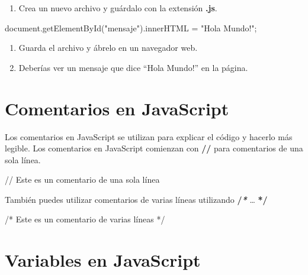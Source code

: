 \documentclass[
  a4paper,
  DIV=11,
  numbers=noendperiod,
  onepage,
  openany]{scrreprt}
\newenvironment{Shaded}{\begin{snugshade}}{\end{snugshade}}
\newcommand{\AttributeTok}[1]{\textcolor[rgb]{0.40,0.45,0.13}{#1}}
\newcommand{\BuiltInTok}[1]{\textcolor[rgb]{0.00,0.23,0.31}{#1}}
\newcommand{\CommentTok}[1]{\textcolor[rgb]{0.37,0.37,0.37}{#1}}
\newcommand{\FunctionTok}[1]{\textcolor[rgb]{0.28,0.35,0.67}{#1}}
\newcommand{\NormalTok}[1]{\textcolor[rgb]{0.00,0.23,0.31}{#1}}
\newcommand{\OperatorTok}[1]{\textcolor[rgb]{0.37,0.37,0.37}{#1}}
\newcommand{\StringTok}[1]{\textcolor[rgb]{0.13,0.47,0.30}{#1}}
\providecommand{\tightlist}{%
  \setlength{\itemsep}{0pt}\setlength{\parskip}{0pt}}\usepackage{longtable,booktabs,array}
\begin{document}
\begin{enumerate}
\def\labelenumi{\arabic{enumi}.}
\setcounter{enumi}{3}
\tightlist
\item
  Crea un nuevo archivo y guárdalo con la extensión \textbf{.js}.
\end{enumerate}

\begin{Shaded}
\begin{Highlighting}[]
\BuiltInTok{document}\OperatorTok{.}\FunctionTok{getElementById}\NormalTok{(}\StringTok{"mensaje"}\NormalTok{)}\OperatorTok{.}\AttributeTok{innerHTML} \OperatorTok{=} \StringTok{"Hola Mundo!"}\OperatorTok{;}
\end{Highlighting}
\end{Shaded}

\begin{enumerate}
\def\labelenumi{\arabic{enumi}.}
\setcounter{enumi}{4}
\item
  Guarda el archivo y ábrelo en un navegador web.
\item
  Deberías ver un mensaje que dice ``Hola Mundo!'' en la página.
\end{enumerate}

\section{Comentarios en JavaScript}\label{comentarios-en-javascript}

Los comentarios en JavaScript se utilizan para explicar el código y
hacerlo más legible. Los comentarios en JavaScript comienzan con
\textbf{//} para comentarios de una sola línea.

\begin{Shaded}
\begin{Highlighting}[]
\CommentTok{// Este es un comentario de una sola línea}
\end{Highlighting}
\end{Shaded}

También puedes utilizar comentarios de varias líneas utilizando
\textbf{/\emph{*}} \ldots{} \textbf{*/}

\begin{Shaded}
\begin{Highlighting}[]
\CommentTok{/*}
\CommentTok{Este es un comentario de varias líneas}
\CommentTok{*/}
\end{Highlighting}
\end{Shaded}

\section{Variables en JavaScript}\label{variables-en-javascript}
\end{document}
